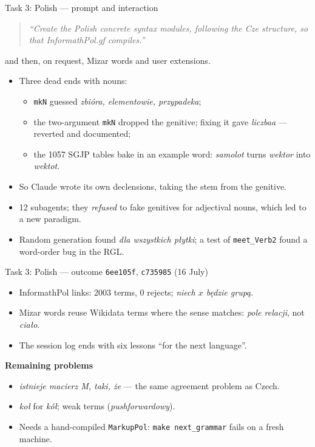\documentclass[10pt,aspectratio=169]{beamer}
\newcommand{\bad}[1]{\textcolor{warn}{#1}}
\newcommand{\ok}[1]{\textcolor{good}{#1}}
\newcommand{\commit}[1]{\texttt{\footnotesize #1}}
\newcommand{\prompt}[1]{\begin{quote}\small\itshape ``#1''\end{quote}}
\begin{document}
\begin{frame}{Task 3: Polish --- prompt and interaction}
  \prompt{Create the Polish concrete syntax modules, following the Cze
    structure, so that InformathPol.gf compiles.}
  and then, on request, Mizar words and user extensions.
  \begin{itemize}\small
    \item Three dead ends with nouns:
      \begin{itemize}\footnotesize
        \item \texttt{mkN} guessed \bad{\emph{zbióra, elementowie, przypadeka}};
        \item the two-argument \texttt{mkN} dropped the genitive; fixing it gave
              \bad{\emph{liczbaa}} --- reverted and documented;
        \item the 1057 SGJP tables bake in an example word:
              \emph{samolot} turns \emph{wektor} into \bad{\emph{wektot}}.
      \end{itemize}
    \item So Claude wrote its own declensions, taking the stem from the genitive.
    \item 12 subagents; they \emph{refused} to fake genitives for adjectival nouns,
          which led to a new paradigm.
    \item Random generation found \bad{\emph{dla wszystkich płytki}}; a test of
          \texttt{meet\_Verb2} found a word-order bug in the RGL.
  \end{itemize}
\end{frame}

\begin{frame}{Task 3: Polish --- outcome}
  \commit{6ee105f}, \commit{c735985} (16 July)
  \begin{itemize}\small
    \item InformathPol links: 2003 terms, 0 rejects;
          \ok{\emph{niech $x$ będzie grupą}}.
    \item Mizar words reuse Wikidata terms where the sense matches:
          \emph{pole relacji}, not \emph{ciało}.
    \item The session log ends with six lessons ``for the next language''.
  \end{itemize}
  \textbf{Remaining problems}
  \begin{itemize}\small
    \item \bad{\emph{istnieje macierz M, taki, że}} --- the same agreement problem as Czech.
    \item \bad{\emph{koł}} for \emph{kół}; weak terms (\emph{pushforwardowy}).
    \item Needs a hand-compiled \texttt{MarkupPol}: \texttt{make next\_grammar} fails
          on a fresh machine.
  \end{itemize}
\end{frame}
\end{document}
